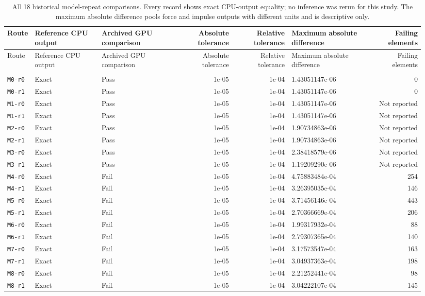 \small
\setlength{\tabcolsep}{4pt}
\renewcommand{\arraystretch}{1.12}
\begin{longtable}{>{\raggedright\arraybackslash}p{0.58in}>{\raggedright\arraybackslash}p{0.74in}>{\raggedright\arraybackslash}p{0.74in}rr>{\raggedright\arraybackslash}p{1.34in}r}
\caption{All 18 historical model-repeat comparisons. Every record shows exact CPU-output equality; no inference was rerun for this study. The maximum absolute difference pools force and impulse outputs with different units and is descriptive only.}\label{supp:routes}\\
\toprule
Route & Reference CPU output & Archived GPU comparison & Absolute tolerance & Relative tolerance & Maximum absolute difference & Failing elements \\
\midrule
\endfirsthead
\toprule
Route & Reference CPU output & Archived GPU comparison & Absolute tolerance & Relative tolerance & Maximum absolute difference & Failing elements \\
\midrule
\endhead
\midrule
\multicolumn{7}{r}{Continued on next page}\\
\endfoot
\bottomrule
\endlastfoot
\texttt{M0-r0} & Exact & Pass & 1e-05 & 1e-04 & 1.43051147e-06 & 0 \\
\texttt{M0-r1} & Exact & Pass & 1e-05 & 1e-04 & 1.43051147e-06 & 0 \\
\texttt{M1-r0} & Exact & Pass & 1e-05 & 1e-04 & 1.43051147e-06 & Not reported \\
\texttt{M1-r1} & Exact & Pass & 1e-05 & 1e-04 & 1.43051147e-06 & Not reported \\
\texttt{M2-r0} & Exact & Pass & 1e-05 & 1e-04 & 1.90734863e-06 & Not reported \\
\texttt{M2-r1} & Exact & Pass & 1e-05 & 1e-04 & 1.90734863e-06 & Not reported \\
\texttt{M3-r0} & Exact & Pass & 1e-05 & 1e-04 & 2.38418579e-06 & Not reported \\
\texttt{M3-r1} & Exact & Pass & 1e-05 & 1e-04 & 1.19209290e-06 & Not reported \\
\texttt{M4-r0} & Exact & Fail & 1e-05 & 1e-04 & 4.75883484e-04 & 254 \\
\texttt{M4-r1} & Exact & Fail & 1e-05 & 1e-04 & 3.26395035e-04 & 146 \\
\texttt{M5-r0} & Exact & Fail & 1e-05 & 1e-04 & 3.71456146e-04 & 443 \\
\texttt{M5-r1} & Exact & Fail & 1e-05 & 1e-04 & 2.70366669e-04 & 206 \\
\texttt{M6-r0} & Exact & Fail & 1e-05 & 1e-04 & 1.99317932e-04 & 88 \\
\texttt{M6-r1} & Exact & Fail & 1e-05 & 1e-04 & 2.79307365e-04 & 140 \\
\texttt{M7-r0} & Exact & Fail & 1e-05 & 1e-04 & 3.17573547e-04 & 163 \\
\texttt{M7-r1} & Exact & Fail & 1e-05 & 1e-04 & 3.04937363e-04 & 198 \\
\texttt{M8-r0} & Exact & Fail & 1e-05 & 1e-04 & 2.21252441e-04 & 98 \\
\texttt{M8-r1} & Exact & Fail & 1e-05 & 1e-04 & 3.04222107e-04 & 145 \\
\end{longtable}
